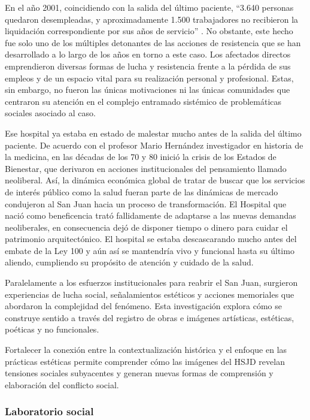 En el año 2001, coincidiendo con la salida del último paciente, “3.640 personas quedaron desempleadas, y aproximadamente 1.500 trabajadores no recibieron la liquidación correspondiente por sus años de servicio” \parencite{Castiblanco2017}. No obstante, este hecho fue solo uno de los múltiples detonantes de las acciones de resistencia que se han desarrollado a lo largo de los años en torno a este caso. Los afectados directos emprendieron diversas formas de lucha y resistencia frente a la pérdida de sus empleos y de un espacio vital para su realización personal y profesional. Estas, sin embargo, no fueron las únicas motivaciones ni las únicas comunidades que centraron su atención en el complejo entramado sistémico de problemáticas sociales asociado al caso.

Ese hospital ya estaba en estado de malestar mucho antes de la salida del último paciente. De acuerdo con el profesor Mario Hernández investigador en historia de la medicina, en las décadas de los 70 y 80 inició la crisis de los Estados de Bienestar, que derivaron en acciones institucionales del pensamiento llamado neoliberal. Así, la dinámica económica global de tratar de buscar que los servicios de interés público como la salud fueran parte de las dinámicas de mercado condujeron al San Juan hacia un proceso de transformación. El Hospital que nació como beneficencia trató fallidamente de adaptarse a las nuevas demandas neoliberales, en consecuencia dejó de disponer tiempo o dinero para cuidar el patrimonio arquitectónico. El hospital se estaba descascarando mucho antes del embate de la Ley 100 y aún así se mantendría vivo y funcional hasta su último aliendo, cumpliendo su propósito de atención y cuidado de la salud.

Paralelamente a los esfuerzos institucionales para reabrir el San Juan, surgieron experiencias de lucha social, señalamientos estéticos y acciones memoriales que abordaron la complejidad del fenómeno. Esta investigación explora cómo se construye sentido a través del registro de obras e imágenes artísticas, estéticas, poéticas y no funcionales.

Fortalecer la conexión entre la contextualización histórica y el enfoque en las prácticas estéticas permite comprender cómo las imágenes del HSJD revelan tensiones sociales subyacentes y generan nuevas formas de comprensión y elaboración del conflicto social.

\subsubsection{Laboratorio social}

